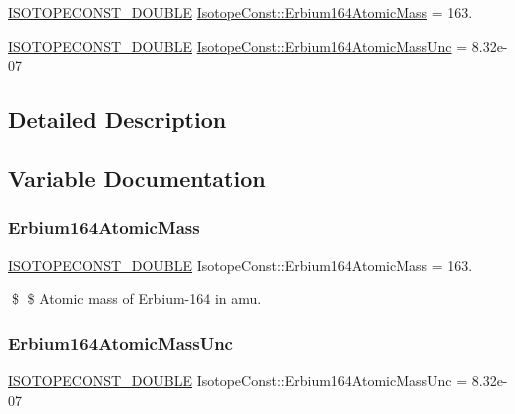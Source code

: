 \begin{DoxyCompactItemize}
\item 
\mbox{\hyperlink{group___isotope_const-_macros_ga8f45a7272ce02c0b4c65c44636ed719a}{I\+S\+O\+T\+O\+P\+E\+C\+O\+N\+S\+T\+\_\+\+D\+O\+U\+B\+LE}} \mbox{\hyperlink{group___isotope_const-_erbium-_er164_gaa2628d96642e2a369a92fff25e8104dd}{Isotope\+Const\+::\+Erbium164\+Atomic\+Mass}} = 163.
\item 
\mbox{\hyperlink{group___isotope_const-_macros_ga8f45a7272ce02c0b4c65c44636ed719a}{I\+S\+O\+T\+O\+P\+E\+C\+O\+N\+S\+T\+\_\+\+D\+O\+U\+B\+LE}} \mbox{\hyperlink{group___isotope_const-_erbium-_er164_ga5b014ab173b16b82b7a46a1631c39b24}{Isotope\+Const\+::\+Erbium164\+Atomic\+Mass\+Unc}} = 8.\+32e-\/07
\end{DoxyCompactItemize}


\subsection{Detailed Description}


\subsection{Variable Documentation}
\mbox{\label{group___isotope_const-_erbium-_er164_gaa2628d96642e2a369a92fff25e8104dd}} 
\subsubsection{\texorpdfstring{Erbium164\+Atomic\+Mass}{Erbium164AtomicMass}}
{\footnotesize\ttfamily \mbox{\hyperlink{group___isotope_const-_macros_ga8f45a7272ce02c0b4c65c44636ed719a}{I\+S\+O\+T\+O\+P\+E\+C\+O\+N\+S\+T\+\_\+\+D\+O\+U\+B\+LE}} Isotope\+Const\+::\+Erbium164\+Atomic\+Mass = 163.}

\$ \$ Atomic mass of Erbium-\/164 in amu. \mbox{\label{group___isotope_const-_erbium-_er164_ga5b014ab173b16b82b7a46a1631c39b24}} 
\subsubsection{\texorpdfstring{Erbium164\+Atomic\+Mass\+Unc}{Erbium164AtomicMassUnc}}
{\footnotesize\ttfamily \mbox{\hyperlink{group___isotope_const-_macros_ga8f45a7272ce02c0b4c65c44636ed719a}{I\+S\+O\+T\+O\+P\+E\+C\+O\+N\+S\+T\+\_\+\+D\+O\+U\+B\+LE}} Isotope\+Const\+::\+Erbium164\+Atomic\+Mass\+Unc = 8.\+32e-\/07}


